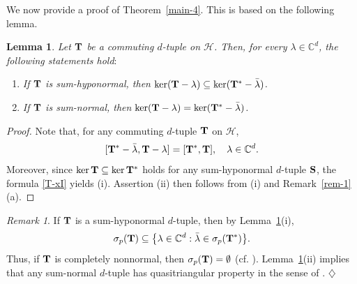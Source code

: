 \documentclass[10pt, a4paper, oneside, reqno]{amsproc}
\numberwithin{equation}{section}
\newtheorem{lemma}[theorem]{Lemma}
\theoremstyle{remark}
\newtheorem{remark}[theorem]{Remark}
\theoremstyle{definition}
\begin{document}
We now provide a proof of Theorem~\ref{main-4}. This is based on the following lemma.
\begin{lemma} 
\label{eigen-adjoint}
Let ${\bf T}$ be a commuting $d$-tuple on $\mathcal H$. Then, for every $\lambda \in \mathbb C^d$, the following statements hold$:$
\begin{enumerate}
\item[(i)] If ${\bf T}$ is sum-hyponormal, then 
$\ker({\bf T} - {\lambda}) \subseteq\ker({\bf T}^*-\bar{\lambda})$.
\item[(ii)] If ${\bf T}$ is sum-normal, then $\ker({\bf T}-\lambda)=\ker({\bf T}^*-\bar{\lambda})$.
\end{enumerate}
\end{lemma}
\begin{proof}
Note that, for any commuting $d$-tuple ${\bf T}$ on $\mathcal H$,
\begin{equation}\label{T-xI} 
[{\bf T}^*- \bar{\lambda}, {\bf T}-\lambda] =  [{\bf T}^*, {\bf T}], \quad \lambda \in \mathbb C^d. 
\end{equation} 
Moreover, since $\ker {\bf T} \subseteq \ker {\bf T}^*$ holds for any sum-hyponormal $d$-tuple ${\bf S}$, 
the formula \eqref{T-xI} yields (i). Assertion (ii) then follows from (i) and Remark~\ref{rem-1}(a). 
\end{proof}
\begin{remark} 
If ${\bf T}$ is a sum-hyponormal $d$-tuple, then by Lemma~\ref{eigen-adjoint}(i), $$\sigma_p({\bf T}) \subseteq \big\{\lambda \in \mathbb C^d : \bar{\lambda} \in \sigma_p({\bf T}^*)\big\}.$$ 
Thus, if ${\bf T}$ is completely nonnormal, then $\sigma_p({\bf T})=\emptyset$ (cf. \cite[Proposition~III.1.1]{MP1989}). Lemma~\ref{eigen-adjoint}(ii) implies that any sum-normal $d$-tuple has quasitriangular property in the sense of \cite[Definition~3]{HK2010}. \hfill $\diamondsuit$
\end{remark}
\end{document}
